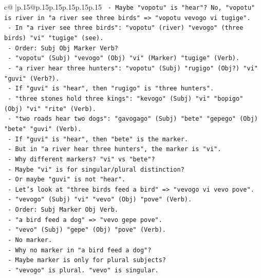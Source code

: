\documentclass{article}
\begin{document}
{\begin{supertabular}{c@{$\;$}|p{.15\linewidth}@{}p{.15\linewidth}p{.15\linewidth}p{.15\linewidth}p{.15\linewidth}p{.15\linewidth}}
{{{\texttt{            {-} Maybe "vopotu" is "hear"? No, "vopotu" is river in "a river see three birds" => "vopotu vevogo vi tugige".} \\
\texttt{            {-} In "a river see three birds": "vopotu" (river) "vevogo" (three birds) "vi" "tugige" (see).} \\
\texttt{            {-} Order: Subj Obj Marker Verb?} \\
\texttt{            {-} "vopotu" (Subj) "vevogo" (Obj) "vi" (Marker) "tugige" (Verb).} \\
\texttt{            {-} "a river hear three hunters": "vopotu" (Subj) "rugigo" (Obj?) "vi" "guvi" (Verb?).} \\
\texttt{            {-} If "guvi" is "hear", then "rugigo" is "three hunters".} \\
\texttt{            {-} "three stones hold three kings": "kevogo" (Subj) "vi" "bopigo" (Obj) "vi" "rite" (Verb).} \\
\texttt{            {-} "two roads hear two dogs": "gavogago" (Subj) "bete" "gepego" (Obj) "bete" "guvi" (Verb).} \\
\texttt{            {-} If "guvi" is "hear", then "bete" is the marker.} \\
\texttt{            {-} But in "a river hear three hunters", the marker is "vi".} \\
\texttt{            {-} Why different markers? "vi" vs "bete"?} \\
\texttt{            {-} Maybe "vi" is for singular/plural distinction?} \\
\texttt{            {-} Or maybe "guvi" is not "hear".} \\
\texttt{            {-} Let's look at "three birds feed a bird" => "vevogo vi vevo pove".} \\
\texttt{              {-} "vevogo" (Subj) "vi" "vevo" (Obj) "pove" (Verb).} \\
\texttt{              {-} Order: Subj Marker Obj Verb.} \\
\texttt{            {-} "a bird feed a dog" => "vevo gepe pove".} \\
\texttt{              {-} "vevo" (Subj) "gepe" (Obj) "pove" (Verb).} \\
\texttt{              {-} No marker.} \\
\texttt{            {-} Why no marker in "a bird feed a dog"?} \\
\texttt{              {-} Maybe marker is only for plural subjects?} \\
\texttt{              {-} "vevogo" is plural. "vevo" is singular.} \\
}}}
\end{supertabular}}
\end{document}
